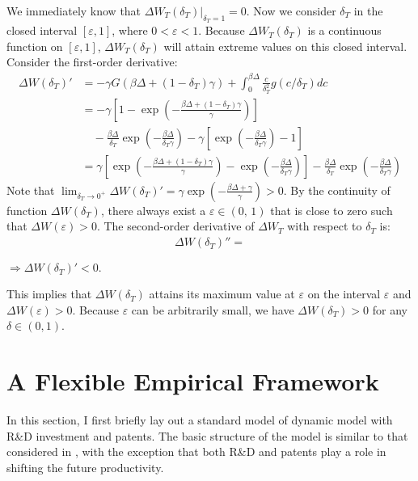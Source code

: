 We immediately know that $\Delta W_T(\delta_T)|_{\delta_T=1} = 0$. Now we consider $\delta_T$ in the closed interval $[\varepsilon, 1]$, where $0<\varepsilon<1$. Because $\Delta W_T(\delta_T)$ is a continuous function on $[\varepsilon, 1]$, $\Delta W_T(\delta_T)$ will attain extreme values on this closed interval. Consider the first-order derivative:
    \begin{align*}
        \Delta W(\delta_T)' &=-\gamma  G\left(\beta \Delta +(1-\delta_T)\gamma \right)+\int_0^{\beta \Delta }\frac{c}{\delta_T^2}g(c/\delta_T)dc \\
            &= -\gamma \left[1-\exp\left(-\frac{\beta \Delta +(1-\delta_T)\gamma }{\gamma }\right)\right] \\
            &\quad -\frac{\beta \Delta}{\delta_T} \exp\left(-\frac{\beta \Delta}{\delta_T \gamma}\right)-\gamma\left[\exp\left(-\frac{\beta \Delta}{\delta_T \gamma}\right)-1\right] \\
            &= \gamma \left[\exp\left(-\frac{\beta \Delta +(1-\delta_T)\gamma }{\gamma }\right)-\exp\left(-\frac{\beta \Delta}{\delta_T\gamma}\right)\right]-\frac{\beta \Delta}{\delta_T}\exp \left(-\frac{\beta \Delta}{\delta_T \gamma}\right)   
    \end{align*}
    Note that $\lim_{\delta_T\rightarrow 0^{+}}\Delta W(\delta_T)' = \gamma \exp\left(-\frac{\beta \Delta+\gamma}{\gamma}\right)>0$. By the continuity of function $\Delta W(\delta_T)$, there always exist  a $\varepsilon \in (0,\,1)$ that is close to zero such that $\Delta W(\varepsilon)>0$. The second-order derivative of $\Delta W_T$ with respect to $\delta_T$ is:
    \begin{align*}
        \Delta W(\delta_T)'' = 
    \end{align*}

    $\Rightarrow  \Delta W(\delta_T)' < 0.$     
 
    This implies that $\Delta W(\delta_T)$ attains its maximum value at $\varepsilon$ on the interval $\varepsilon$ and $\Delta W(\varepsilon)>0$. Because $\varepsilon$ can be arbitrarily small, we have $\Delta W(\delta_T)>0$ for any $\delta\in(0, 1)$. 

\section{A Flexible Empirical Framework}\label{Sec2}
In this section, I first briefly lay out a standard model of dynamic model with R\&D investment and patents. The basic structure of the model is similar to that considered in \cite{Awetal.2011,Doraszelski2013,Peters2016, Peters2017}, with the exception that both R\&D and patents play a role in shifting the future productivity. 

